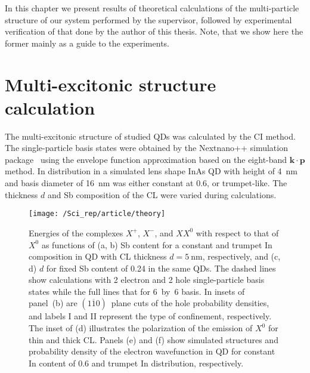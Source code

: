 \medskip
In this chapter we present results of theoretical calculations of the multi-particle structure of our system performed by the supervisor, followed by experimental verification of that done by the author of this thesis. Note, that we show here the former mainly as a guide to the experiments.
\newpage 




\section{Multi-excitonic structure calculation} \label{sec:scirep_theory}
The multi-excitonic structure of studied QDs was calculated by the CI method. The single-particle basis states were obtained by the Nextnano++ simulation package~\citep{next} using the envelope function approximation based on the eight-band $\mathbf{k \cdot p}$ method. In distribution in a simulated lens shape InAs QD with height of 4~nm and basis diameter of 16~nm was either constant at 0.6, or trumpet-like. The thickness $d$ and Sb composition of the CL were varied during calculations. 
%
\begin{figure}
	\centering
	\texttt{[image: /Sci\_rep/article/theory]}
	\caption{Energies of the complexes $X^+$, $X^-$, and $XX^0$ with respect to that of $X^0$ as functions of (a, b) Sb content for a constant and trumpet In composition in QD with CL thickness $d=5~\mathrm{nm}$, respectively, and (c, d) $d$ for fixed Sb content of 0.24 in the same QDs. The dashed lines show calculations with 2 electron and 2 hole single-particle basis states while the full lines that for 6~by~6 basis. In insets of panel~(b) are $(1\overline{1}0)$~plane cuts of the hole probability densities, and labels I and II represent the type of confinement, respectively. The inset of (d) illustrates the polarization of the emission of $X^0$ for thin and thick CL. Panels (e) and (f) show simulated structures and probability density of the electron wavefunction in QD for constant In content of 0.6 and trumpet In distribution, respectively.}
	\label{fig:Sci_rep_theory}
\end{figure}
%

